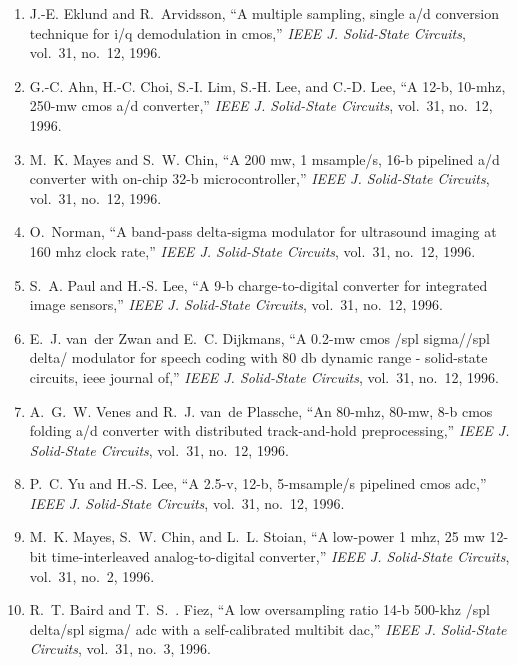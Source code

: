 \begin{enumerate}
\item
J.-E. Eklund and R.~Arvidsson, ``A multiple sampling, single a/d conversion
  technique for i/q demodulation in cmos,'' \emph{{IEEE} J. Solid-State
  Circuits}, vol.~31, no.~12, 1996.

\item
G.-C. Ahn, H.-C. Choi, S.-I. Lim, S.-H. Lee, and C.-D. Lee, ``A 12-b, 10-mhz,
  250-mw cmos a/d converter,'' \emph{{IEEE} J. Solid-State Circuits}, vol.~31,
  no.~12, 1996.

\item
M.~K. Mayes and S.~W. Chin, ``A 200 mw, 1 msample/s, 16-b pipelined a/d
  converter with on-chip 32-b microcontroller,'' \emph{{IEEE} J. Solid-State
  Circuits}, vol.~31, no.~12, 1996.

\item
O.~Norman, ``A band-pass delta-sigma modulator for ultrasound imaging at 160
  mhz clock rate,'' \emph{{IEEE} J. Solid-State Circuits}, vol.~31, no.~12,
  1996.

\item
S.~A. Paul and H.-S. Lee, ``A 9-b charge-to-digital converter for integrated
  image sensors,'' \emph{{IEEE} J. Solid-State Circuits}, vol.~31, no.~12,
  1996.

\item
E.~J. van~der Zwan and E.~C. Dijkmans, ``A 0.2-mw cmos /spl sigma//spl delta/
  modulator for speech coding with 80 db dynamic range - solid-state circuits,
  ieee journal of,'' \emph{{IEEE} J. Solid-State Circuits}, vol.~31, no.~12,
  1996.

\item
A.~G.~W. Venes and R.~J. van~de Plassche, ``An 80-mhz, 80-mw, 8-b cmos folding
  a/d converter with distributed track-and-hold preprocessing,'' \emph{{IEEE}
  J. Solid-State Circuits}, vol.~31, no.~12, 1996.

\item
P.~C. Yu and H.-S. Lee, ``A 2.5-v, 12-b, 5-msample/s pipelined cmos adc,''
  \emph{{IEEE} J. Solid-State Circuits}, vol.~31, no.~12, 1996.

\item
M.~K. Mayes, S.~W. Chin, and L.~L. Stoian, ``A low-power 1 mhz, 25 mw 12-bit
  time-interleaved analog-to-digital converter,'' \emph{{IEEE} J. Solid-State
  Circuits}, vol.~31, no.~2, 1996.

\item
R.~T. Baird and T.~S.~. Fiez, ``A low oversampling ratio 14-b 500-khz /spl
  delta/spl sigma/ adc with a self-calibrated multibit dac,'' \emph{{IEEE} J.
  Solid-State Circuits}, vol.~31, no.~3, 1996.


\end{enumerate}
